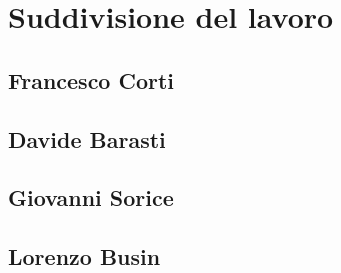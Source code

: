\newpage

\section{Suddivisione del lavoro}

\subsection{Francesco Corti}

\subsection{Davide Barasti}

\subsection{Giovanni Sorice}

\subsection{Lorenzo Busin}
